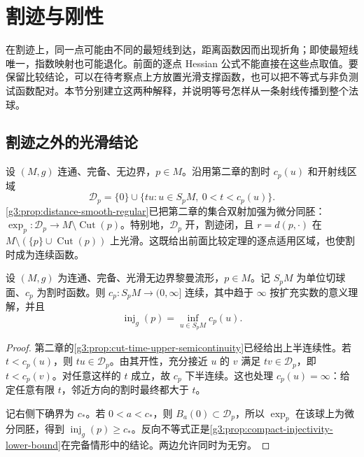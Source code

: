 
% 
% 
% 

\section{割迹与刚性}
\label{g3:sec:0704}

在割迹上，同一点可能由不同的最短线到达，距离函数因而出现折角；即使最短线唯一，指数映射也可能退化。前面的逐点 Hessian 公式不能直接在这些点取值。要保留比较结论，可以在待考察点上方放置光滑支撑函数，也可以把不等式与非负测试函数配对。本节分别建立这两种解释，并说明等号怎样从一条射线传播到整个法球。

\subsection{割迹之外的光滑结论}
\label{g3:subsec:0704:01}

设 \((M,g)\) 连通、完备、无边界，\(p\in M\)。沿用第二章的割时 \(c_p(u)\) 和开射线区域
\[
	\mathcal D_p=\{0\}\cup\{tu:u\in S_pM,\ 0<t<c_p(u)\}.
\]
\cref{g3:prop:distance-smooth-regular}已把第二章的集合双射加强为微分同胚：\(\exp_p:\mathcal D_p\to M\setminus\operatorname{Cut}(p)\)。特别地，\(\mathcal D_p\) 开，割迹闭，且 \(r=d(p,\cdot)\) 在 \(M\setminus(\{p\}\cup\operatorname{Cut}(p))\) 上光滑。这既给出前面比较定理的逐点适用区域，也使割时成为连续函数。

\begin{proposition}\label{g3:prop:cut-time-continuous}
	设 \((M,g)\) 为连通、完备、光滑无边界黎曼流形，\(p\in M\)。记 \(S_pM\) 为单位切球面、\(c_p\) 为割时函数。则 \(c_p:S_pM\to(0,\infty]\) 连续，其中趋于 \(\infty\) 按扩充实数的意义理解，并且
	\[
		\operatorname{inj}_g(p)=\inf_{u\in S_pM}c_p(u).
	\]
\end{proposition}
\begin{proof}
	第二章的\cref{g3:prop:cut-time-upper-semicontinuity}已经给出上半连续性。若 \(t<c_p(u)\)，则 \(tu\in\mathcal D_p\)。由其开性，充分接近 \(u\) 的 \(v\) 满足 \(tv\in\mathcal D_p\)，即 \(t<c_p(v)\)。对任意这样的 \(t\) 成立，故 \(c_p\) 下半连续。这也处理 \(c_p(u)=\infty\)：给定任意有限 \(t\)，邻近方向的割时最终都大于 \(t\)。

	记右侧下确界为 \(c_*\)。若 \(0<a<c_*\)，则 \(B_a(0)\subset\mathcal D_p\)，所以 \(\exp_p\) 在该球上为微分同胚，得到 \(\operatorname{inj}_g(p)\ge c_*\)。反向不等式正是\cref{g3:prop:compact-injectivity-lower-bound}在完备情形中的结论。两边允许同时为无穷。
\end{proof}


